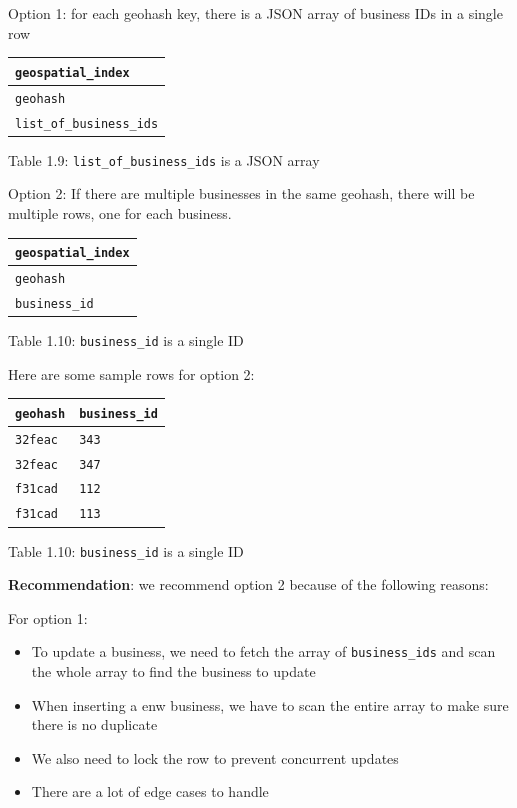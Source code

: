 \documentclass{report}
\theoremstyle{definition}
\begin{document}
Option 1: for each geohash key, there is a JSON array of business IDs in a single row

\begin{tabular}{|p{6cm}|}
\hline
\lstinline|geospatial_index| \\
\hline
\lstinline|geohash| \\
\lstinline|list_of_business_ids| \\
\hline
\end{tabular}

\vspace{10pt}
\centerline{Table 1.9: \lstinline|list_of_business_ids| is a JSON array}

Option 2: If there are multiple businesses in the same geohash, there will be multiple rows, one for each business.

\begin{tabular}{|p{6cm}|}
\hline
\lstinline|geospatial_index| \\
\hline
\lstinline|geohash| \\
\lstinline|business_id| \\
\hline
\end{tabular}

\vspace{10pt}
\centerline{Table 1.10: \lstinline|business_id| is a single ID}

Here are some sample rows for option 2:

\begin{tabular}{|p{6cm}|p{6cm}|}
\hline
\lstinline|geohash| & \lstinline|business_id| \\
\hline
\lstinline|32feac| & \lstinline|343| \\
\lstinline|32feac| & \lstinline|347| \\
\lstinline|f31cad| & \lstinline|112| \\
\lstinline|f31cad| & \lstinline|113| \\
\hline
\end{tabular}


\vspace{10pt}
\centerline{Table 1.10: \lstinline|business_id| is a single ID}

\textbf{Recommendation}: we recommend option 2 because of the following reasons:

For option 1:

\begin{itemize}
\item
To update a business, we need to fetch the array of \lstinline|business_ids| and scan the whole array to find the business to update
\item
When inserting a enw business, we have to scan the entire array to make sure there is no duplicate
\item
We also need to lock the row to prevent concurrent updates
\item
There are a lot of edge cases to handle
\end{itemize}
\end{document}
